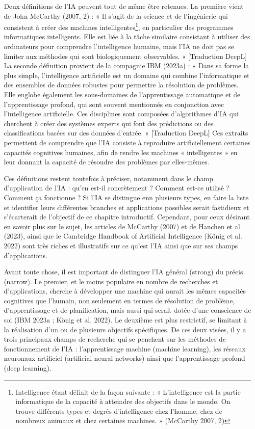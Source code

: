 \documentclass[
  letterpaper,
]{scrbook}
\begin{document}
Deux définitions de l'IA peuvent tout de même être retenues. La première
vient de John McCarthy (2007, 2) : « Il s'agit de la science et de
l'ingénierie qui consistent à créer des machines
intelligentes\footnote{Intelligence étant définit de la façon suivante :
  « L'intelligence est la partie informatique de la capacité à atteindre
  des objectifs dans le monde. On trouve différents types et degrés
  d'intelligence chez l'homme, chez de nombreux animaux et chez
  certaines machines. » (McCarthy 2007, 2)}, en particulier des
programmes informatiques intelligents. Elle est liée à la tâche
similaire consistant à utiliser des ordinateurs pour comprendre
l'intelligence humaine, mais l'IA ne doit pas se limiter aux méthodes
qui sont biologiquement observables. » {[}Traduction DeepL{]} La seconde
définition provient de la compagnie IBM (2023a) : « Dans sa forme la
plus simple, l'intelligence artificielle est un domaine qui combine
l'informatique et des ensembles de données robustes pour permettre la
résolution de problèmes. Elle englobe également les sous-domaines de
l'apprentissage automatique et de l'apprentissage profond, qui sont
souvent mentionnés en conjonction avec l'intelligence artificielle. Ces
disciplines sont composées d'algorithmes d'IA qui cherchent à créer des
systèmes experts qui font des prédictions ou des classifications basées
sur des données d'entrée. » {[}Traduction DeepL{]} Ces extraits
permettent de comprendre que l'IA consiste à reproduire artificiellement
certaines capacités cognitives humaines, afin de rendre les machines «
intelligentes » en leur donnant la capacité de résoudre des problèmes
par elles-mêmes.

Ces définitions restent toutefois à préciser, notamment dans le champ
d'application de l'IA : qu'en est-il concrètement ? Comment est-ce
utilisé ? Comment ça fonctionne ? Si l'IA se distingue enn plusieurs
types, en faire la liste et identifier leurs différentes branches et
applications possibles serait fastidieux et s'écarterait de l'objectif
de ce chapitre introductif. Cependant, pour ceux désirant en savoir plus
sur le sujet, les articles de McCarthy (2007) et de Hanchen et al.
(2023), ainsi que le Cambridge Handbook of Artificial Intelligence
(König et al. 2022) sont très riches et illustratifs sur ce qu'est l'IA
ainsi que sur ses champs d'applications.

Avant toute chose, il est important de distinguer l'IA général (strong)
du précis (narrow). Le premier, et le moins populaire en nombre de
recherches et d'applications, cherche à développer une machine qui
aurait les mêmes capacités cognitives que l'humain, non seulement en
termes de résolution de problème, d'apprentissage et de planification,
mais aussi qui serait dotée d'une conscience de soi (IBM 2023a ; König
et al. 2022). Le deuxième est plus restrictif, se limitant à la
réalisation d'un ou de plusieurs objectifs spécifiques. De ces deux
visées, il y a trois principaux champs de recherche qui se penchent sur
les méthodes de fonctionnement de l'IA : l'apprentissage machine
(machine learning), les réseaux neuronaux artificiel (artificial neural
networks) ainsi que l'apprentissage profond (deep learning).
\end{document}
